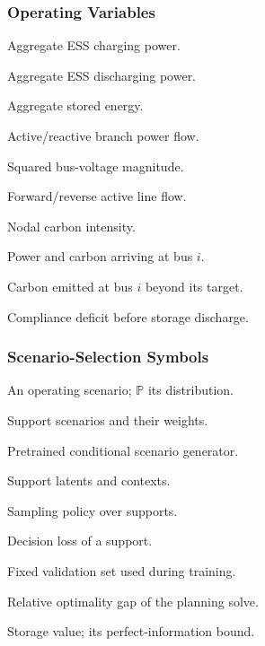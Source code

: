 \documentclass[journal]{IEEEtran}
\begin{document}
\subsubsection*{Operating Variables}
\begin{IEEEdescription}
\item[$P_{i,s,t}^{\mathrm{es,ch}}$] Aggregate ESS charging power.
\item[$P_{i,s,t}^{\mathrm{es,dc}}$] Aggregate ESS discharging power.
\item[$e_{i,s,t}^{\mathrm{es}}$] Aggregate stored energy.
\item[$P_{ij,s,t},Q_{ij,s,t}$] Active/reactive branch power flow.
\item[$v_{i,s,t}$] Squared bus-voltage magnitude.
\item[$P_{ij,s,t}^{+},P_{ij,s,t}^{-}$] Forward/reverse active line flow.
\item[$\mathscr{w}_{i,s,t}$] Nodal carbon intensity.
\item[$A_{i,s,t},B_{i,s,t}$] Power and carbon arriving at bus $i$.
\item[$\Xi_{i,s,t}$] Carbon emitted at bus $i$ beyond its target.
\item[$D_{i,s,t}$] Compliance deficit before storage discharge.
\end{IEEEdescription}

\subsubsection*{Scenario-Selection Symbols}
\begin{IEEEdescription}
\item[$\xi$] An operating scenario; $\mathbb{P}$ its distribution.
\item[$\mathcal{X},\boldsymbol{\pi}$] Support scenarios and their weights.
\item[$G_{\phi}$] Pretrained conditional scenario generator.
\item[$\boldsymbol{Z},\boldsymbol{\Omega}$] Support latents and contexts.
\item[$q_{\boldsymbol{\theta}}$] Sampling policy over supports.
\item[$\mathcal{L}$] Decision loss of a support.
\item[$\mathcal{V}$] Fixed validation set used during training.
\item[$\epsilon$] Relative optimality gap of the planning solve.
\item[$V_{\mathrm{m}},V^{\mathrm{PI}}$] Storage value; its perfect-information bound.
\end{IEEEdescription}
\end{document}
